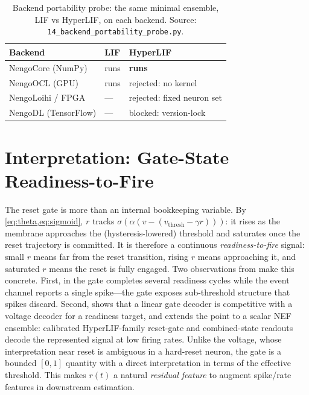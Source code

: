 \documentclass[11pt]{article}
\newcommand{\vth}{v_{\mathrm{thresh}}}
\newcommand{\code}[1]{\texttt{#1}}
\begin{document}
\begin{table}[t]
  \centering
  \caption{Backend portability probe: the same minimal ensemble, LIF vs
  HyperLIF, on each backend. Source: \code{14\_backend\_portability\_probe.py}.}
  \label{tab:backend}
  \small
  \begin{tabular}{lll}
    \toprule
    Backend & LIF & HyperLIF \\
    \midrule
    NengoCore (NumPy)   & runs & \textbf{runs} \\
    NengoOCL (GPU)      & runs & rejected: no kernel \\
    NengoLoihi / FPGA   & ---  & rejected: fixed neuron set \\
    NengoDL (TensorFlow)& ---  & blocked: version-lock \\
    \bottomrule
  \end{tabular}
\end{table}

\section{Interpretation: Gate-State Readiness-to-Fire}\label{sec:readiness}
The reset gate is more than an internal bookkeeping variable. By
\cref{eq:theta,eq:sigmoid}, $r$ tracks $\sigma(\alpha(v-(\vth-\gamma r)))$: it
rises as the membrane approaches the (hysteresis-lowered) threshold and saturates
once the reset trajectory is committed. It is therefore a continuous
\emph{readiness-to-fire} signal: small $r$ means far from the reset transition,
rising $r$ means approaching it, and saturated $r$ means the reset is fully
engaged. Two observations from  make this concrete. First, in
 the gate completes several readiness cycles while the event
channel reports a single spike---the gate exposes sub-threshold structure that
spikes discard. Second,  shows that a linear gate decoder is
competitive with a voltage decoder for a readiness target, and
 extends the point to a scalar NEF ensemble:
calibrated HyperLIF-family reset-gate and combined-state readouts decode the
represented signal at low firing rates. Unlike the voltage, whose interpretation
near reset is ambiguous in a hard-reset neuron, the gate is a bounded $[0,1]$
quantity with a direct interpretation in terms of the effective threshold. This
makes $r(t)$ a natural \emph{residual feature} to augment spike/rate features in
downstream estimation.
\end{document}
